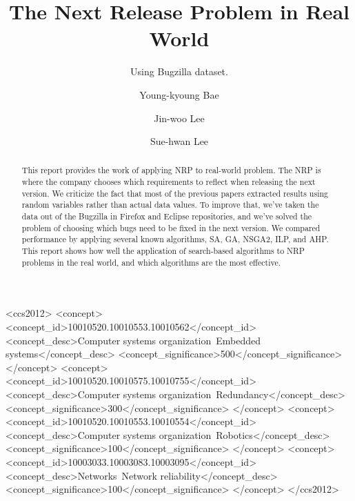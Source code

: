 \documentclass[sigconf]{acmart}
\begin{document}
\title{The Next Release Problem in Real World}
\subtitle{Using Bugzilla dataset.}


\author{Young-kyoung Bae}


\author{Jin-woo Lee}

\author{Sue-hwan Lee}

\begin{abstract}
This report provides the work of applying NRP to real-world problem. The NRP is where the company chooses which requirements to reflect when releasing the next version. We criticize the fact that most of the previous papers extracted results using random variables rather than actual data values. To improve that, we've taken the data out of the Bugzilla in Firefox and Eclipse repositories, and we've solved the problem of choosing which bugs need to be fixed in the next version. We compared performance by applying several known algorithms, SA, GA, NSGA2, ILP, and AHP. This report shows how well the application of search-based algorithms to NRP problems in the real world, and which algorithms are the most effective.
\end{abstract}

%
%
\begin{CCSXML}
<ccs2012>
 <concept>
  <concept_id>10010520.10010553.10010562</concept_id>
  <concept_desc>Computer systems organization~Embedded systems</concept_desc>
  <concept_significance>500</concept_significance>
 </concept>
 <concept>
  <concept_id>10010520.10010575.10010755</concept_id>
  <concept_desc>Computer systems organization~Redundancy</concept_desc>
  <concept_significance>300</concept_significance>
 </concept>
 <concept>
  <concept_id>10010520.10010553.10010554</concept_id>
  <concept_desc>Computer systems organization~Robotics</concept_desc>
  <concept_significance>100</concept_significance>
 </concept>
 <concept>
  <concept_id>10003033.10003083.10003095</concept_id>
  <concept_desc>Networks~Network reliability</concept_desc>
  <concept_significance>100</concept_significance>
 </concept>
</ccs2012>
\end{CCSXML}


\maketitle





\end{document}
